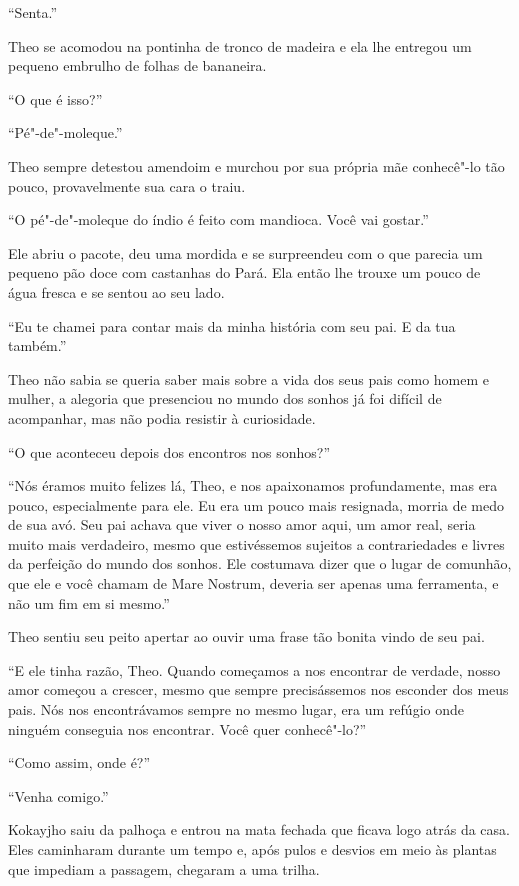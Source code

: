 ``Senta.''

Theo se acomodou na pontinha de tronco de madeira e ela lhe entregou um
pequeno embrulho de folhas de bananeira.

``O que é isso?''

``Pé"-de"-moleque.''

Theo sempre detestou amendoim e murchou por sua própria mãe conhecê"-lo
tão pouco, provavelmente sua cara o traiu.

``O pé"-de"-moleque do índio é feito com mandioca. Você vai gostar.''

Ele abriu o pacote, deu uma mordida e se surpreendeu com o que parecia
um pequeno pão doce com castanhas do Pará. Ela então lhe trouxe um pouco
de água fresca e se sentou ao seu lado.

``Eu te chamei para contar mais da minha história com seu pai. E da tua
também.''

Theo não sabia se queria saber mais sobre a vida dos seus pais como
homem e mulher, a alegoria que presenciou no mundo dos sonhos já foi
difícil de acompanhar, mas não podia resistir à curiosidade.

``O que aconteceu depois dos encontros nos sonhos?''

``Nós éramos muito felizes lá, Theo, e nos apaixonamos profundamente,
mas era pouco, especialmente para ele. Eu era um pouco mais resignada,
morria de medo de sua avó. Seu pai achava que viver o nosso amor aqui,
um amor real, seria muito mais verdadeiro, mesmo que estivéssemos
sujeitos a contrariedades e livres da perfeição do mundo dos sonhos. Ele
costumava dizer que o lugar de comunhão, que ele e você chamam de Mare
Nostrum, deveria ser apenas uma ferramenta, e não um fim em si mesmo.''

Theo sentiu seu peito apertar ao ouvir uma frase tão bonita vindo de seu
pai.

``E ele tinha razão, Theo. Quando começamos a nos encontrar de verdade,
nosso amor começou a crescer, mesmo que sempre precisássemos nos
esconder dos meus pais. Nós nos encontrávamos sempre no mesmo lugar, era
um refúgio onde ninguém conseguia nos encontrar. Você quer conhecê"-lo?''

``Como assim, onde é?''

``Venha comigo.''

Kokayjho saiu da palhoça e entrou na mata fechada que ficava logo atrás
da casa. Eles caminharam durante um tempo e, após pulos e desvios em
meio às plantas que impediam a passagem, chegaram a uma trilha.


